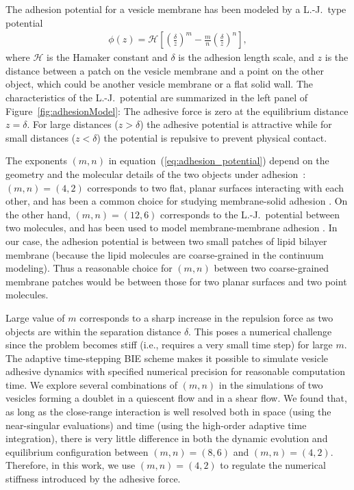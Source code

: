\documentclass[prf,superscriptaddress,showkeys]{revtex4-1}
\begin{document}
The adhesion potential for a vesicle membrane has been modeled by a
L.-J.~type potential
\begin{align}
\label{eq:adhesion_potential}
  \phi(z) = \mathcal{H} \left[ 
    \left(\frac{\delta}{z}\right)^m - \frac{m}{n} \left(\frac{\delta}{z}\right)^n \right],
\end{align}
where $\mathcal{H}$ is the Hamaker constant and $\delta$ is the adhesion
length scale, and $z$ is the distance between a patch on the vesicle
membrane and a point on the other object, which could be another vesicle
membrane or a flat solid wall.  The characteristics of the
L.-J.~potential are summarized in the left panel of
Figure~\ref{fig:adhesionModel}: The adhesive force is zero at the
equilibrium distance $z=\delta$.  For large distances ($z> \delta$) the
adhesive potential is attractive while for small distances ($z <
\delta$) the potential is repulsive to prevent physical contact.

The exponents $(m,n)$ in equation~(\ref{eq:adhesion_potential}) depend
on the geometry and the molecular details of the two objects under
adhesion~\cite{Book_IntermolecularSurfaceForces}: $(m,n)=(4,2)$
corresponds to two flat, planar surfaces interacting with each other,
and has been a common choice for studying membrane-solid adhesion
\cite{Seifert1990_PRA,suk-sei2001, ShiFengGao2006_ActaMechSin,
LinFreund2007_IntJSolidsStructures, BlountMiksisDavis2013_PRSa,
YoungStone2017_PRF}.  On the other hand, $(m,n) = (12,6)$ corresponds to
the L.-J.~potential between two molecules, and has been used to model
membrane-membrane adhesion  \cite{FlormannAouane2017_SciReports}.  In
our case, the adhesion potential is between two small patches of lipid
bilayer membrane (because the lipid molecules are coarse-grained in the
continuum modeling).  Thus a reasonable choice for $(m,n)$ between two
coarse-grained membrane patches would be between those for two planar
surfaces and two point molecules.
 
Large value of $m$ corresponds to a sharp increase in the repulsion
force as two objects are within the separation distance $\delta$.  This
poses a numerical challenge since the problem becomes stiff (i.e.,
requires a very small time step) for large $m$.  The adaptive
time-stepping BIE scheme makes it possible to simulate vesicle adhesive
dynamics with specified numerical precision for reasonable computation
time.  We explore several combinations of $(m,n)$ in the simulations of
two vesicles forming a doublet in a quiescent flow and in a shear flow.
We found that, as long as the close-range interaction is well resolved
both in space (using the near-singular evaluations) and time (using the
high-order adaptive time integration), there is very little difference
in both the dynamic evolution and equilibrium configuration between
$(m,n)=(8,6)$ and $(m,n)=(4,2)$.  Therefore, in this work, we use $(m,n)
= (4,2)$ to regulate the numerical stiffness introduced by the adhesive
force. 
\end{document}
